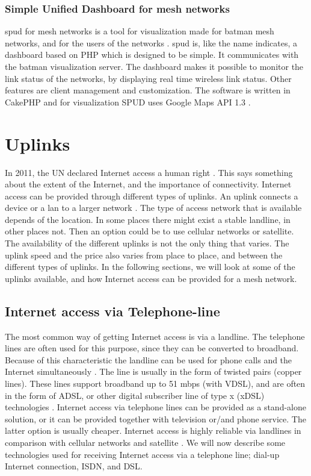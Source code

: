 \subsubsection{Simple Unified Dashboard for mesh networks}
\gls{spud} for mesh networks is a tool for visualization made for \gls{batman} mesh networks, and for the users of the networks \cite{spud}. \gls{spud} is, like the name indicates, a dashboard based on PHP which is designed to be simple. It communicates with the \gls{batman} visualization server. The dashboard makes it possible to monitor the link status of the networks, by displaying real time wireless link status. Other features are client management and customization. The software is written in CakePHP and for visualization SPUD uses Google Maps API 1.3 \cite{spud}.

\section{Uplinks}
In 2011, the UN declared Internet access a human right \cite{HR}. This says something about the extent of the Internet, and the importance of connectivity. Internet access can be provided through different types of uplinks. An uplink connects a device or a \gls{lan} to a larger network \cite{uplink}. The type of access network that is available depends of the location. In some places there might exist a stable landline, in other places not. Then an option could be to use cellular networks or satellite. The availability of the different uplinks is not the only thing that varies. The uplink speed and the price also varies from place to place, and between the different types of uplinks. In the following sections, we will look at some of the uplinks available, and how Internet access can be provided for a mesh network.

\subsection{Internet access via Telephone-line}
The most common way of getting Internet access is via a landline. The telephone lines are often used for this purpose, since they can be converted to broadband. Because of this characteristic the landline can be used for phone calls and the Internet simultaneously \cite{internet}. The line is usually in the form of twisted pairs (copper lines). These lines support broadband up to 51 \gls{mbps} (with VDSL), and are often in the form of ADSL, or other digital subscriber line of type x (xDSL) technologies \cite{audestad}. Internet access via telephone lines can be provided as a stand-alone solution, or it can be provided together with television or/and phone service. The latter option is usually cheaper. Internet access is highly reliable via landlines in comparison with cellular networks and satellite \cite{cablevssatellite}. We will now describe some technologies used for receiving Internet access via a telephone line; dial-up Internet connection, ISDN, and DSL. 

